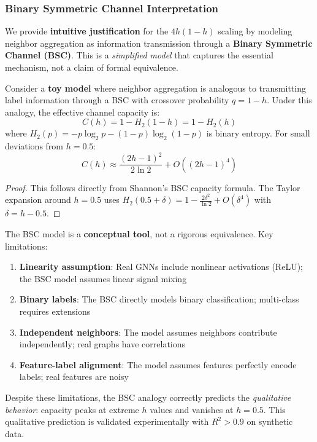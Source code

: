 \subsubsection{Binary Symmetric Channel Interpretation}

We provide \textbf{intuitive justification} for the $4h(1-h)$ scaling by modeling neighbor aggregation as information transmission through a \textbf{Binary Symmetric Channel (BSC)}. This is a \textit{simplified model} that captures the essential mechanism, not a claim of formal equivalence.

\begin{proposition}
\label{prop:bsc_capacity}
Consider a \textbf{toy model} where neighbor aggregation is analogous to transmitting label information through a BSC with crossover probability $q = 1 - h$. Under this analogy, the effective channel capacity is:
\begin{equation}
    C(h) = 1 - H_2(1-h) = 1 - H_2(h)
\end{equation}
where $H_2(p) = -p\log_2 p - (1-p)\log_2(1-p)$ is binary entropy. For small deviations from $h = 0.5$:
\begin{equation}
    C(h) \approx \frac{(2h-1)^2}{2\ln 2} + O((2h-1)^4)
\end{equation}
\end{proposition}

\begin{proof}
This follows directly from Shannon's BSC capacity formula. The Taylor expansion around $h = 0.5$ uses $H_2(0.5 + \delta) = 1 - \frac{2\delta^2}{\ln 2} + O(\delta^4)$ with $\delta = h - 0.5$.
\end{proof}

\begin{remark}
\label{rem:bsc_scope}
The BSC model is a \textbf{conceptual tool}, not a rigorous equivalence. Key limitations:
\begin{enumerate}
    \item \textbf{Linearity assumption}: Real GNNs include nonlinear activations (ReLU); the BSC model assumes linear signal mixing
    \item \textbf{Binary labels}: The BSC directly models binary classification; multi-class requires extensions
    \item \textbf{Independent neighbors}: The model assumes neighbors contribute independently; real graphs have correlations
    \item \textbf{Feature-label alignment}: The model assumes features perfectly encode labels; real features are noisy
\end{enumerate}
Despite these limitations, the BSC analogy correctly predicts the \textit{qualitative behavior}: capacity peaks at extreme $h$ values and vanishes at $h = 0.5$. This qualitative prediction is validated experimentally with $R^2 > 0.9$ on synthetic data.
\end{remark}

